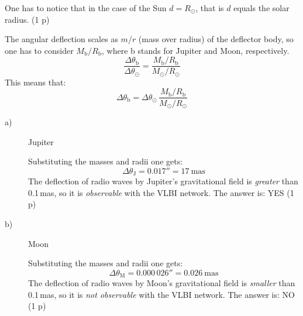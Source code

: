 One has to notice that in the case of the Sun $d = R_\odot$, that is $d$
equals the solar radius. \hfill(1 p)

The angular deflection scales as $m/r$ (mass over radius) of the deflector
body, so one has to consider $M_{\mathrm{b}}/R_{\mathrm{b}}$, where b stands
for Jupiter and Moon, respectively.
\[
\frac{\Delta\theta_{\mathrm{b}}}{\Delta\theta_\odot}
  = \frac{M_{\mathrm{b}}/R_{\mathrm{b}}}{M_\odot/R_\odot}
  \tag*{(2.1)\quad(2 p)}
\]
This means that:
\[
\Delta\theta_{\mathrm{b}}
  = \Delta\theta_\odot\,\frac{M_{\mathrm{b}}/R_{\mathrm{b}}}{M_\odot/R_\odot}
  \tag*{(2.2)\quad(1 p)}
\]
\begin{description}
\item[a)] Jupiter

Substituting the masses and radii one gets:
\[
\Delta\theta_{\mathrm{J}} = \boxed{0.017''} = \boxed{17~\mathrm{mas}}
  \tag*{(2 p)}
\]
The deflection of radio waves by Jupiter's gravitational field is
\emph{greater} than 0.1\,mas, so it is \emph{observable} with the VLBI
network. The answer is: YES \hfill(1 p)

\item[b)] Moon

Substituting the masses and radii one gets:
\[
\Delta\theta_{\mathrm{M}} = \boxed{0.000\,026''} = \boxed{0.026~\mathrm{mas}}
  \tag*{(2 p)}
\]
The deflection of radio waves by Moon's gravitational field is \emph{smaller}
than 0.1\,mas, so it is \emph{not observable} with the VLBI network. The
answer is: NO \hfill(1 p)
\end{description}
